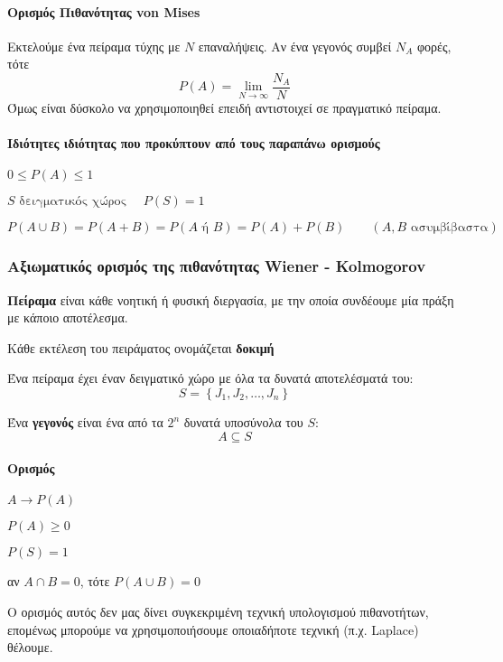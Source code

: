 \documentclass[11pt,a4paper,notitlepage,fleqn,draft]{article}
\begin{document}
	\paragraph{Ορισμός Πιθανότητας von Mises}
	Εκτελούμε ένα πείραμα τύχης με \(N\) επαναλήψεις. Αν ένα
	γεγονός συμβεί \(N_A\) φορές, τότε
	\[
	P(A) = \lim_{N\to  \infty } \frac{N_A}{N}
	\]
	Όμως είναι δύσκολο να χρησιμοποιηθεί επειδή αντιστοιχεί σε
	πραγματικό πείραμα.
	\paragraph{Ιδιότητες ιδιότητας που προκύπτουν από
		τους παραπάνω ορισμούς}
	\begin{enumroman}
		\item \( 0 \leq P(A) \leq 1 \)
		\item \( S \text{ δειγματικός χώρος } \quad 
		P(S) = 1 \)
		\item \( P(A\cup B) = P(A+B) = P(A \text{ ή } B)
		= P(A) + P(B) \qquad (A,B \text{ ασυμβίβαστα})
		 \)
	\end{enumroman}
	
	\subsubsection{Αξιωματικός ορισμός της πιθανότητας
		Wiener - Kolmogorov}
	
	\textbf{Πείραμα} είναι κάθε νοητική ή φυσική διεργασία,
	με την οποία
	συνδέουμε μία πράξη με κάποιο αποτέλεσμα.
	
	Κάθε εκτέλεση του πειράματος ονομάζεται \textbf{δοκιμή}
	
	Ένα πείραμα έχει έναν δειγματικό χώρο με όλα τα δυνατά
	αποτελέσματά του:
	\[
	S = \left\lbrace J_1,J_2,\dots,J_n \right\rbrace
	\]
	
	Ένα \textbf{γεγονός} είναι ένα από τα \( 2^n \) δυνατά
	υποσύνολα του \(S\): \[ A \subseteq S \]
	\paragraph{Ορισμός}
	\( A \to P(A) \)	
	\begin{enumroman}
		\item \( P(A) \geq 0 \)
		\item \( P(S) = 1 \)
		\item αν \( A \cap B = 0 \), τότε \( P(A \cup B)
		= 0 \)
	\end{enumroman}
	
	Ο ορισμός αυτός δεν μας δίνει συγκεκριμένη τεχνική υπολογισμού
	πιθανοτήτων, επομένως μπορούμε να χρησιμοποιήσουμε οποιαδήποτε
	τεχνική (π.χ. Laplace) θέλουμε.
	
\end{document}
